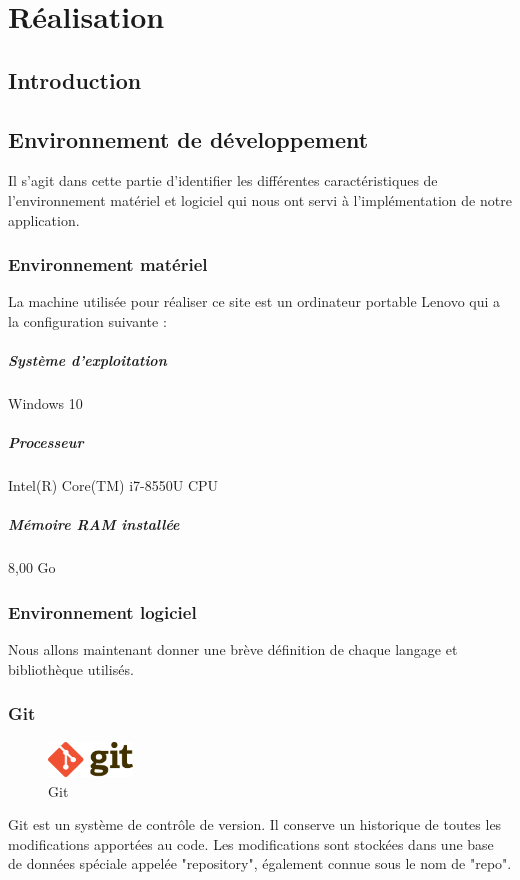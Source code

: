 \chapter{Réalisation} \label{Chapter4}

\section{Introduction}

\section{Environnement de développement}
Il s’agit dans cette partie d’identifier les différentes caractéristiques de l’environnement matériel et logiciel qui nous ont servi à l’implémentation de notre application.

\subsection{Environnement matériel}
La machine utilisée pour réaliser ce site est un ordinateur portable Lenovo qui a la configuration suivante :

\paragraph{Système d’exploitation} Windows 10
\paragraph{Processeur} Intel(R) Core(TM) i7-8550U CPU
\paragraph{Mémoire RAM installée} 8,00 Go

\subsection{Environnement logiciel}
Nous allons maintenant donner une brève définition de chaque langage et bibliothèque utilisés.

\subsection*{Git}
\begin{figure} %
    \centering
    \includegraphics[width=0.2\textwidth]{Figures/git.png}
    \caption{Git}
\end{figure}
Git est un système de contrôle de version. Il conserve un historique de toutes les modifications apportées au code. Les modifications sont stockées dans une base de données spéciale appelée "repository", également connue sous le nom de "repo".

